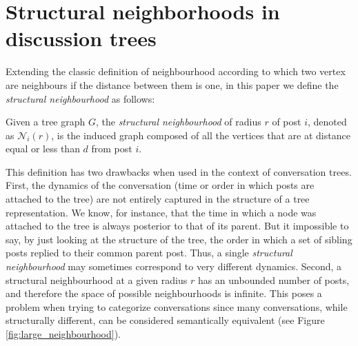 \documentclass[9pt,technote]{IEEEtran}
\begin{document}
\section{Structural neighborhoods in discussion trees}
Extending the classic definition of neighbourhood according to which two vertex are neighbours if the distance between them is one, in this paper we define the \textit{structural neighbourhood} as follows:

\begin{definition}
Given a tree graph $G$, the \textit{structural neighbourhood} of radius $r$ of post $i$, denoted as $\mathcal{N}_i(r)$, is the induced graph composed of all the vertices that are at distance equal or less than $d$ from post $i$.
\end{definition}
This definition has two drawbacks when used in the context of conversation trees.
First, the dynamics of the conversation (time or order in which posts are attached to the tree) are not entirely captured in the structure of a tree representation. We know, for instance, that the time in which a node was attached to the tree is always posterior to that of its parent. But it impossible to say, by just looking at the structure of the tree, the order in which a set of sibling posts replied to their common parent post. Thus, a single \textit{structural neighbourhood} may sometimes correspond to very different dynamics.
Second, a structural neighbourhood at a given radius $r$ has an unbounded number of posts, and therefore the space of possible neighbourhoods is infinite. This poses a problem when trying to categorize conversations since many conversations, while structurally different, can be considered semantically equivalent (see Figure \ref{fig:large_neighbourhood}).
\end{document}
